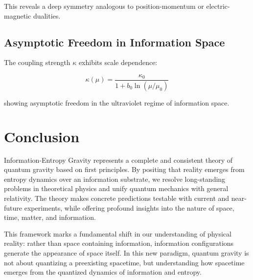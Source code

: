 \documentclass{article}
\begin{document}
This reveals a deep symmetry analogous to position-momentum or electric-magnetic dualities.

\subsection{Asymptotic Freedom in Information Space}

The coupling strength $\kappa$ exhibits scale dependence:

\begin{equation}
\kappa(μ) = \frac{\kappa_0}{1 + b_0 \ln(μ/μ_0)}
\end{equation}

showing asymptotic freedom in the ultraviolet regime of information space.

\section{Conclusion}

Information-Entropy Gravity represents a complete and consistent theory of quantum gravity based on first principles. By positing that reality emerges from entropy dynamics over an information substrate, we resolve long-standing problems in theoretical physics and unify quantum mechanics with general relativity. The theory makes concrete predictions testable with current and near-future experiments, while offering profound insights into the nature of space, time, matter, and information.

This framework marks a fundamental shift in our understanding of physical reality: rather than space containing information, information configurations generate the appearance of space itself. In this new paradigm, quantum gravity is not about quantizing a preexisting spacetime, but understanding how spacetime emerges from the quantized dynamics of information and entropy.
\end{document}
